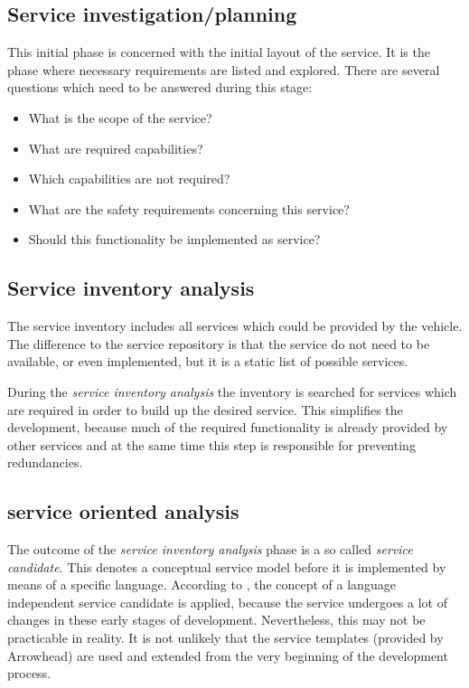 \subsection{Service investigation/planning}
This initial phase is concerned with the initial layout of the service. It is the phase where necessary requirements are listed and explored. There are several questions which need to be answered during this stage:
\begin{itemize}
\item What is the scope of the service?
\item What are required capabilities?
\item Which capabilities are not required?
\item What are the safety requirements concerning this service?
\item Should this functionality be implemented as service?
\end{itemize}



\subsection{Service inventory analysis}
The service inventory includes all services which could be provided by the vehicle. The difference to the service repository is that the service do not need to be available, or even implemented, but it is a static list of possible services.

During the \emph{service inventory analysis} the inventory is searched for services which are required in order to build up the desired service. This simplifies the development, because much of the required functionality is already provided by other services and at the same time this step is responsible for preventing redundancies.




\subsection{service oriented analysis}

The outcome of the \emph{service inventory analysis} phase is a so called \emph{service candidate}. This denotes a conceptual service model before it is implemented by means of a specific language. According to \cite[p.42]{erl2011}, the concept of a language independent service candidate is applied, because the service undergoes a lot of changes in these early stages of development. Nevertheless, this may not be practicable in reality. It is not unlikely that the service templates (provided by Arrowhead) are used and extended from the very beginning of the development process.


